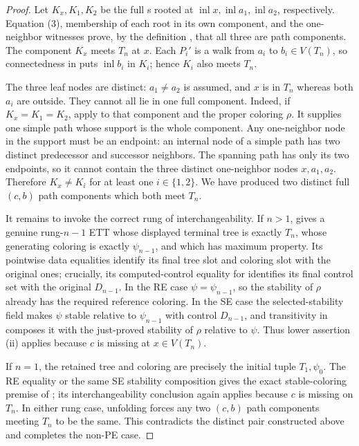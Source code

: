 \begin{proof}
Let $K_x,K_1,K_2$ be the full s rooted at
$\operatorname{inl}x,\operatorname{inl}a_1,
\operatorname{inl}a_2$, respectively.  Equation (3), membership of each
root in its own component, and the one-neighbor witnesses prove, by the
definition , that all three are path
components.  The component $K_x$ meets $T_n$ at $x$.  Each $P_i'$ is a
walk from $a_i$ to $b_i\in V(T_n)$, so connectedness in
 puts $\operatorname{inl}b_i$ in $K_i$;
hence $K_i$ also meets $T_n$.

The three leaf nodes are distinct: $a_1\ne a_2$ is assumed, and $x$ is
in $T_n$ whereas both $a_i$ are outside.  They cannot all lie in one full
component.  Indeed, if $K_x=K_1=K_2$, apply
 to that component and the proper
coloring $\rho$.  It supplies one simple path whose support is the whole
component.  Any one-neighbor node in the support must be an endpoint:
an internal node of a simple path has two distinct predecessor and
successor neighbors.  The spanning path has only its two endpoints, so
it cannot contain the three distinct one-neighbor nodes $x,a_1,a_2$.
Therefore $K_x\ne K_i$ for at least one $i\in\{1,2\}$.  We have produced
two distinct full $(c,b)$ path components which both meet $T_n$.

It remains to invoke the correct rung of interchangeability.  If $n>1$,
 gives a genuine rung-$n-1$ ETT whose
displayed terminal tree is exactly $T_n$, whose generating coloring is
exactly $\psi_{n-1}$, and which has maximum property.  Its pointwise
data equalities identify its final tree slot and coloring slot with the
original ones; crucially, its computed-control equality for
 identifies its final control set with
the original $D_{n-1}$.  In the RE case $\psi=\psi_{n-1}$, so the
stability of $\rho$ already has the required reference coloring.  In the
SE case the selected-stability field makes $\psi$ stable relative to
$\psi_{n-1}$ with control $D_{n-1}$, and transitivity in
 composes it with the just-proved stability of $\rho$
relative to $\psi$.  Thus lower assertion (ii) applies because $c$ is
missing at $x\in V(T_n)$.

If $n=1$, the retained tree and coloring are precisely the initial tuple
$T_1,\psi_0$.  The RE equality or the same SE stability composition gives
the exact stable-coloring premise of ; its
interchangeability conclusion again applies because $c$ is missing on
$T_n$.  In either rung case, unfolding 
forces any two $(c,b)$ path components meeting $T_n$ to be the same.
This contradicts the distinct pair constructed above and completes the
non-PE case.


\end{proof}

